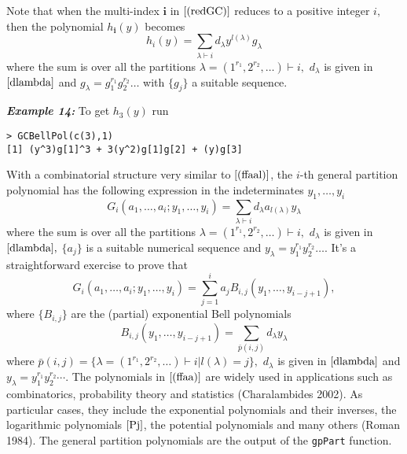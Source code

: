 Note that when the multi-index \(\boldsymbol{i}\) in \(\eqref{(redGC)}\) reduces to a positive integer \(i,\) then the polynomial \(h_{\boldsymbol{i}}(y)\) becomes
\begin{equation}
h_i(y) = \sum_{\lambda \vdash i}  d_{\lambda}  y^{l(\lambda)} g_{\lambda} 
\label{(ffaal)}
\end{equation}
where the sum is over all the partitions \(\lambda=(1^{r_1}, 2^{r_2}, \ldots) \vdash i,\) \(d_{\lambda}\) is given in \(\eqref{dlambda}\) and \(g_{\lambda}= g_1^{r_1} g_2^{r_2} \ldots\) with \(\{g_j\}\) a suitable sequence.

\hskip-0.5cm\textbf{\emph{Example 14:}} To get \(h_{3}(y)\) run

\begin{verbatim}
> GCBellPol(c(3),1)
[1] (y^3)g[1]^3 + 3(y^2)g[1]g[2] + (y)g[3]
\end{verbatim}

With a combinatorial structure very similar to \(\eqref{(ffaal)}\), the \(i\)-th general partition polynomial has the following expression in the indeterminates \(y_1, \ldots, y_i\)
\begin{equation}
G_i( a_1, \ldots, a_i; y_1, \ldots, y_i) = \sum_{\lambda \vdash i}  d_{\lambda}  a_{l(\lambda)} y_{\lambda} 
\label{(ffaa)}
\end{equation}
where the sum is over all the partitions \(\lambda=(1^{r_1}, 2^{r_2}, \ldots) \vdash i,\) \(d_{\lambda}\) is given in \(\eqref{dlambda},\) \(\{a_j\}\) is a suitable numerical sequence and \(y_{\lambda} = y_1^{r_1} y_2^{r_2} \ldots.\) It's a straightforward exercise to prove that
\begin{equation}
G_i( a_1, \ldots, a_i; y_1, \ldots, y_i) = \sum_{j=1}^i a_j B_{i,j}(y_1, \ldots, y_{i-j+1}), 
\label{gpp}
\end{equation}
where \(\{B_{i,j}\}\) are the (partial) exponential Bell polynomials
\begin{equation}
B_{i,j}(y_1,  \ldots, y_{i-j+1}) =  \sum_{\bar{p}(i,j)} d_{\lambda} y_{\lambda} 
\label{(parexpBell)}
\end{equation}
where \(\bar{p}(i,j) = \{\lambda=(1^{r_1}, 2^{r_2}, \ldots) \vdash i | l(\lambda)=j\},\) \(d_{\lambda}\) is given in \(\eqref{dlambda}\) and \(y_{\lambda} =y_1^{r_1} y_2^{r_2} \cdots.\) The polynomials in \(\eqref{(ffaa)}\) are widely used in applications such as combinatorics, probability theory and statistics (Charalambides 2002). As particular cases, they include the exponential polynomials and their inverses, the logarithmic polynomials \(\eqref{Pj}\), the potential polynomials and many others (Roman 1984). The general partition polynomials are the output of the \texttt{gpPart} function.

